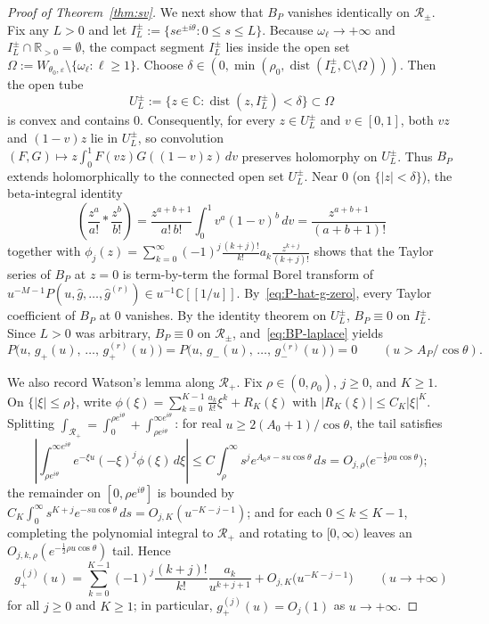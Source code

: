 \documentclass[10pt,reqno]{amsart}
\numberwithin{equation}{section}
\theoremstyle{definition}
\newcommand{\R}{\mathbb{R}}
\newcommand{\C}{\mathbb{C}}
\newcommand{\cR}{\mathcal{R}}
\DeclareMathOperator{\dist}{dist}
\begin{document}
\begin{proof}[Proof of Theorem~\ref{thm:sv}]
We next show that $B_P$ vanishes identically on $\cR_\pm$. Fix any $L > 0$ and let $I_L^\pm := \{s e^{\pm i\theta} : 0 \le s \le L\}$. Because $\omega_\ell \to +\infty$ and $I_L^\pm \cap \R_{>0} = \emptyset$, the compact segment $I_L^\pm$ lies inside the open set $\Omega := W_{\theta_0,\varepsilon} \setminus \{\omega_\ell : \ell \ge 1\}$. Choose $\delta \in (0, \min(\rho_0, \dist(I_L^\pm, \C \setminus \Omega)))$. Then the open tube
\[
  U_L^\pm := \{z \in \C : \dist(z, I_L^\pm) < \delta\} \subset \Omega
\]
is convex and contains $0$. Consequently, for every $z \in U_L^\pm$ and $v \in [0,1]$, both $vz$ and $(1-v)z$ lie in $U_L^\pm$, so convolution $(F, G) \mapsto z \int_0^1 F(vz) G((1-v)z)\,dv$ preserves holomorphy on $U_L^\pm$. Thus $B_P$ extends holomorphically to the connected open set $U_L^\pm$. Near $0$ (on $\{|z| < \delta\}$), the beta-integral identity
\[
  \left(\frac{z^a}{a!} * \frac{z^b}{b!}\right) = \frac{z^{a+b+1}}{a!\,b!}\int_0^1 v^a (1-v)^b\,dv = \frac{z^{a+b+1}}{(a+b+1)!}
\]
together with $\phi_j(z) = \sum_{k=0}^\infty (-1)^j \frac{(k+j)!}{k!} a_k \frac{z^{k+j}}{(k+j)!}$ shows that the Taylor series of $B_P$ at $z = 0$ is term-by-term the formal Borel transform of $u^{-M-1} P(u, \widehat{g}, \dots, \widehat{g}^{(r)}) \in u^{-1}\C[[1/u]]$. By~\eqref{eq:P-hat-g-zero}, every Taylor coefficient of $B_P$ at $0$ vanishes. By the identity theorem on $U_L^\pm$, $B_P \equiv 0$ on $I_L^\pm$. Since $L > 0$ was arbitrary, $B_P \equiv 0$ on $\cR_\pm$, and~\eqref{eq:BP-laplace} yields
\begin{equation}\label{eq:lateral-ode}
  P\bigl(u,\, g_+(u),\, \dots,\, g_+^{(r)}(u)\bigr) = P\bigl(u,\, g_-(u),\, \dots,\, g_-^{(r)}(u)\bigr) = 0
  \qquad (u > A_P/\cos\theta).
\end{equation}

We also record Watson's lemma along $\cR_+$. Fix $\rho \in (0, \rho_0)$, $j \ge 0$, and $K \ge 1$. On $\{|\xi| \le \rho\}$, write $\phi(\xi) = \sum_{k=0}^{K-1} \frac{a_k}{k!}\xi^k + R_K(\xi)$ with $|R_K(\xi)| \le C_K |\xi|^K$. Splitting $\int_{\cR_+} = \int_0^{\rho e^{i\theta}} + \int_{\rho e^{i\theta}}^{\infty e^{i\theta}}$: for real $u \ge 2(A_0 + 1)/\cos\theta$, the tail satisfies
\[
  \left|\int_{\rho e^{i\theta}}^{\infty e^{i\theta}} e^{-\xi u} (-\xi)^j \phi(\xi)\,d\xi\right|
  \le C \int_\rho^\infty s^j e^{A_0 s - s u \cos\theta}\,ds = O_{j,\rho}\bigl(e^{-\frac{1}{2}\rho u \cos\theta}\bigr);
\]
the remainder on $[0, \rho e^{i\theta}]$ is bounded by $C_K \int_0^\infty s^{K+j} e^{-s u \cos\theta}\,ds = O_{j,K}(u^{-K-j-1})$; and for each $0 \le k \le K-1$, completing the polynomial integral to $\cR_+$ and rotating to $[0,\infty)$ leaves an $O_{j,k,\rho}(e^{-\frac{1}{2}\rho u \cos\theta})$ tail. Hence
\begin{equation}\label{eq:watson}
  g_+^{(j)}(u) = \sum_{k=0}^{K-1} (-1)^j \frac{(k+j)!}{k!} \frac{a_k}{u^{k+j+1}} + O_{j,K}\bigl(u^{-K-j-1}\bigr)
  \qquad (u \to +\infty)
\end{equation}
for all $j \ge 0$ and $K \ge 1$; in particular, $g_+^{(j)}(u) = O_j(1)$ as $u \to +\infty$.


\end{proof}
\end{document}
